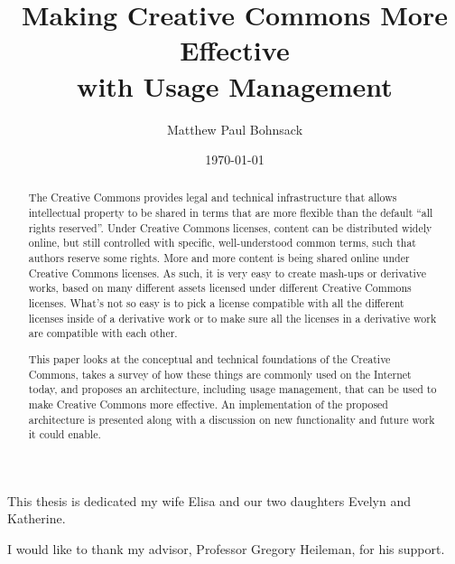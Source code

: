\documentclass[botnum,fleqn,final]{unmeethesis}
\newcommand{\mytitle}{Making Creative Commons More Effective\\with Usage Management}
\newcommand{\myauthor}{Matthew Paul Bohnsack}
\begin{document}
\frontmatter

\title{\mytitle}
\author{\myauthor}





\date{\today}

\maketitle

\makecopyright

\begin{dedication}
   This thesis is dedicated my wife Elisa and our two daughters Evelyn and Katherine.
\end{dedication}

\begin{acknowledgments}
   \vspace{1.1in}
   I would like to thank my advisor, Professor Gregory Heileman, for his support.
\end{acknowledgments}

\maketitleabstract

\begin{abstract}
The Creative Commons provides legal and technical infrastructure that allows
intellectual property to be shared in terms that are more flexible than the
default ``all rights reserved''.  Under Creative Commons licenses, content can
be distributed widely online, but still controlled with specific,
well-understood common terms, such that authors reserve some rights.  More and
more content is being shared online under Creative Commons licenses.  As such,
it is very easy to create mash-ups or derivative works, based on many different
assets licensed under different Creative Commons licenses.  What's not so easy
is to pick a license compatible with all the different licenses inside of a
derivative work or to make sure all the licenses in a derivative work are
compatible with each other.

This paper looks at the conceptual and technical foundations of the Creative
Commons, takes a survey of how these things are commonly used on the Internet
today, and proposes an architecture, including usage management, that can be
used to make Creative Commons more effective.  An implementation of the proposed
architecture is presented along with a discussion on new functionality and future
work it could enable.
\end{abstract}
\end{document}
